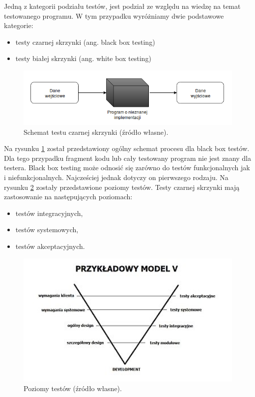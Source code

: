 Jedną z kategorii podziału testów, jest podział ze względu na wiedzę na temat testowanego programu.
W tym przypadku wyróżniamy dwie podstawowe kategorie:
\begin{itemize}
\item testy czarnej skrzynki (ang. black box testing)
\item testy białej skrzynki (ang. white box testing)
\end{itemize}

\begin{figure}[h]
    \centering
    \includegraphics[width = 13cm]{chapter01/black-box.png}
    \caption{Schemat testu czarnej skrzynki (źródło własne).}
    \label{fig:black-box}
\end{figure}

Na rysunku \ref{fig:black-box} został przedstawiony ogólny schemat procesu dla black box testów.
Dla tego przypadku fragment kodu lub cały testowany program nie jest znany dla testera.
Black box testing może odnosić się zarówno do testów funkcjonalnych jak i niefunkcjonalnych.
Najcześciej jednak dotyczy on pierwszego rodzaju.
Na rysunku \ref{fig:tests-levels} zostały przedstawione poziomy testów.
Testy czarnej skrzynki mają zastosowanie na następujących poziomach:
\begin{itemize}
\item testów integracyjnych,
\item testów systemowych,
\item testów akceptacyjnych.
\end{itemize}

\begin{figure}[h]
    \centering
    \includegraphics[width = 13cm]{chapter01/tests_levels.jpg}
    \caption{Poziomy testów (źródło własne).}
    \label{fig:tests-levels}
\end{figure}

